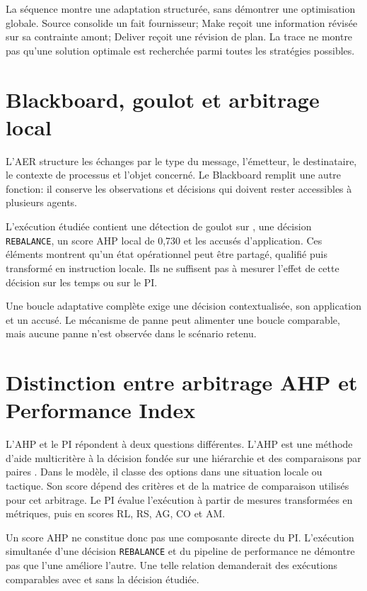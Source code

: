 La séquence montre une adaptation structurée, sans démontrer une optimisation globale. Source consolide un fait fournisseur; Make reçoit une information révisée sur sa contrainte amont; Deliver reçoit une révision de plan. La trace ne montre pas qu'une solution optimale est recherchée parmi toutes les stratégies possibles.


\section{Blackboard, goulot et arbitrage local}

L'AER structure les échanges par le type du message, l'émetteur, le destinataire, le contexte de processus et l'objet concerné. Le Blackboard remplit une autre fonction: il conserve les observations et décisions qui doivent rester accessibles à plusieurs agents.

L'exécution étudiée contient une détection de goulot sur , une décision \texttt{REBALANCE}, un score AHP local de 0,730 et les accusés d'application. Ces éléments montrent qu'un état opérationnel peut être partagé, qualifié puis transformé en instruction locale. Ils ne suffisent pas à mesurer l'effet de cette décision sur les temps ou sur le PI.

Une boucle adaptative complète exige une décision contextualisée, son application et un accusé. Le mécanisme de panne peut alimenter une boucle comparable, mais aucune panne n'est observée dans le scénario retenu.

\section{Distinction entre arbitrage AHP et Performance Index}

L'AHP et le PI répondent à deux questions différentes. L'AHP est une méthode d'aide multicritère à la décision fondée sur une hiérarchie et des comparaisons par paires \cite{saaty1990}. Dans le modèle, il classe des options dans une situation locale ou tactique. Son score dépend des critères et de la matrice de comparaison utilisés pour cet arbitrage. Le PI évalue l'exécution à partir de mesures transformées en métriques, puis en scores RL, RS, AG, CO et AM.

Un score AHP ne constitue donc pas une composante directe du PI. L'exécution simultanée d'une décision \texttt{REBALANCE} et du pipeline de performance ne démontre pas que l'une améliore l'autre. Une telle relation demanderait des exécutions comparables avec et sans la décision étudiée.
